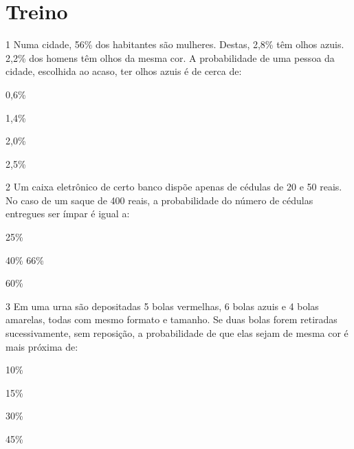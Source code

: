 \begin{emptybox}
\end{emptybox}

\pagebreak
\section*{Treino}

\num{1} Numa cidade, 56\% dos habitantes são mulheres. Destas, 2,8\% têm olhos
azuis. 2,2\% dos homens têm olhos da mesma cor. A probabilidade de uma pessoa 
da cidade, escolhida ao acaso, ter olhos azuis é de cerca de:

\begin{escolha}

  \item 0,6\%

  \item 1,4\%

  \item 2,0\%

  \item 2,5\%

\end{escolha}


\num{2} Um caixa eletrônico de certo banco dispõe apenas de cédulas de 20 e 50
reais. No caso de um saque de 400 reais, a probabilidade do número de
cédulas entregues ser ímpar é igual a:

\begin{escolha}

  \item 25\%

  \item 40\%
66\%

  \item 60\%

\end{escolha}


\num{3} Em uma urna são depositadas 5 bolas vermelhas, 6 bolas azuis e 4 bolas
amarelas, todas com mesmo formato e tamanho. Se duas bolas forem
retiradas sucessivamente, sem reposição, a probabilidade de que elas
sejam de mesma cor é mais próxima de:

\begin{escolha}

  \item 10\%

  \item 15\%

  \item 30\%

  \item 45\%

\end{escolha}






